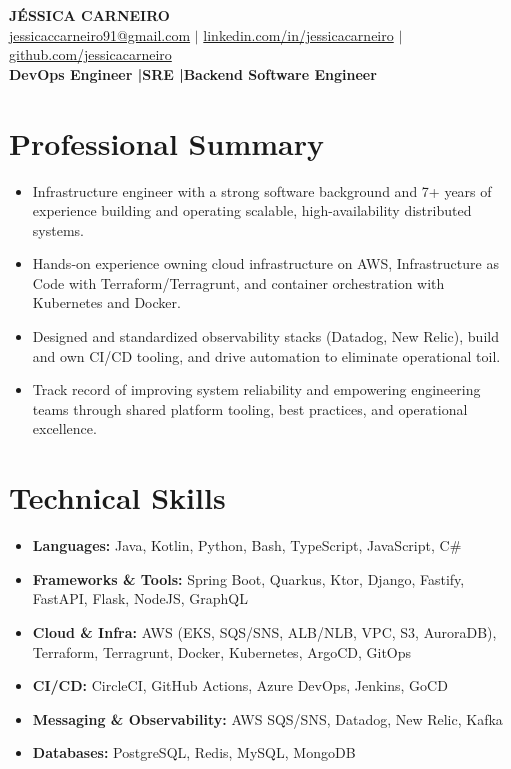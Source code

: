\documentclass[letterpaper,10.5pt]{article}
\newcommand{\resumeItem}[1]{
  \item\small{#1 \vspace{-2pt}}
}
\begin{document}
\begin{center}
  {\Huge\bfseries\color{accent} J\'ESSICA CARNEIRO} \\[6pt]
  \small
  \href{mailto:jessicaccarneiro91@gmail.com}{jessicaccarneiro91@gmail.com}
  \hspace{6pt}$|$\hspace{6pt}
  \href{https://www.linkedin.com/in/jessicacarneiro}{linkedin.com/in/jessicacarneiro}
  \hspace{6pt}$|$\hspace{6pt}
  \href{https://github.com/jessicacarneiro}{github.com/jessicacarneiro}
  \\[4pt]
  {\small\color{subaccent}\bfseries DevOps Engineer \quad|\quad SRE \quad|\quad Backend Software Engineer}
\end{center}

\section{Professional Summary}
\begin{itemize}[leftmargin=0.2in, itemsep=1pt, parsep=0pt]
  \resumeItem{Infrastructure engineer with a strong software background and 7+ years of experience building and operating scalable, high-availability distributed systems.}
  \resumeItem{Hands-on experience owning cloud infrastructure on AWS, Infrastructure as Code with Terraform/Terragrunt, and container orchestration with Kubernetes and Docker.}
  \resumeItem{Designed and standardized observability stacks (Datadog, New Relic), build and own CI/CD tooling, and drive automation to eliminate operational toil.}
  \resumeItem{Track record of improving system reliability and empowering engineering teams through shared platform tooling, best practices, and operational excellence.}
\end{itemize}

\section{Technical Skills}
\begin{itemize}[leftmargin=0.05in, label={}, itemsep=2pt, parsep=0pt]
  \small\item\textbf{Languages:} Java, Kotlin, Python, Bash, TypeScript, JavaScript, C\#
  \small\item\textbf{Frameworks \& Tools:} Spring Boot, Quarkus, Ktor, Django, Fastify, FastAPI, Flask, NodeJS, GraphQL
  \small\item\textbf{Cloud \& Infra:} AWS (EKS, SQS/SNS, ALB/NLB, VPC, S3, AuroraDB), Terraform, Terragrunt, Docker, Kubernetes, ArgoCD, GitOps
  \small\item\textbf{CI/CD:} CircleCI, GitHub Actions, Azure DevOps, Jenkins, GoCD
  \small\item\textbf{Messaging \& Observability:} AWS SQS/SNS, Datadog, New Relic, Kafka
  \small\item\textbf{Databases:} PostgreSQL, Redis, MySQL, MongoDB
\end{itemize}
\end{document}
